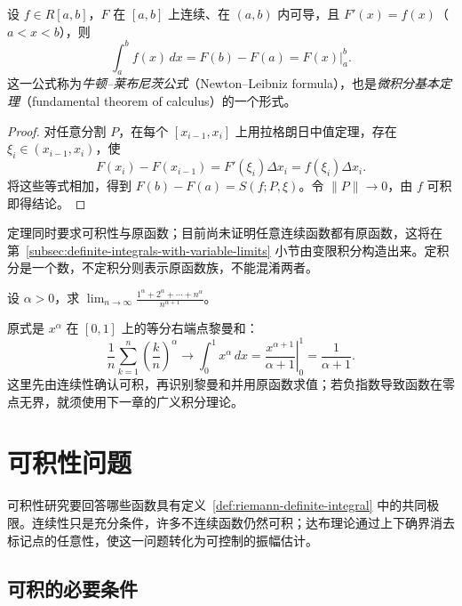 \begin{theorem}[牛顿--莱布尼茨公式]
\label{thm:newton-leibniz-integrable-antiderivative}
设 $f\in R[a,b]$，$F$ 在 $[a,b]$ 上连续、在 $(a,b)$ 内可导，且 $F'(x)=f(x)$（$a<x<b$），则
\begin{equation}
    \int_a^b f(x)\,dx=F(b)-F(a)
    =\left.F(x)\right|_a^b.
    \label{eq:newton-leibniz-formula}
\end{equation}
这一公式称为\emph{牛顿--莱布尼茨公式}（Newton--Leibniz formula），也是\emph{微积分基本定理}（fundamental theorem of calculus）的一个形式。
\end{theorem}
\begin{proof}
对任意分割 $P$，在每个 $[x_{i-1},x_i]$ 上用拉格朗日中值定理，存在 $\xi_i\in(x_{i-1},x_i)$，使
\[
    F(x_i)-F(x_{i-1})=F'(\xi_i)\Delta x_i=f(\xi_i)\Delta x_i.
\]
将这些等式相加，得到 $F(b)-F(a)=S(f;P,\xi)$。令 $\|P\|\to0$，由 $f$ 可积即得结论。
\end{proof}

定理同时要求可积性与原函数；目前尚未证明任意连续函数都有原函数，这将在第~\ref{subsec:definite-integrals-with-variable-limits} 小节由变限积分构造出来。定积分是一个数，不定积分则表示原函数族，不能混淆两者。

\begin{example}
\label{ex:power-sum-limit-by-integral}
设 $\alpha>0$，求 $\displaystyle\lim_{n\to\infty}\frac{1^\alpha+2^\alpha+\cdots+n^\alpha}{n^{\alpha+1}}$。
\end{example}
\begin{solve}
原式是 $x^\alpha$ 在 $[0,1]$ 上的等分右端点黎曼和：
\[
    \frac1n\sum_{k=1}^n\left(\frac kn\right)^\alpha
    \longrightarrow\int_0^1x^\alpha\,dx
    =\left.\frac{x^{\alpha+1}}{\alpha+1}\right|_0^1
    =\frac1{\alpha+1}.
\]
这里先由连续性确认可积，再识别黎曼和并用原函数求值；若负指数导致函数在零点无界，就须使用下一章的广义积分理论。
\end{solve}

\section{可积性问题}
\label{sec:integrability}

可积性研究要回答哪些函数具有定义~\ref{def:riemann-definite-integral} 中的共同极限。连续性只是充分条件，许多不连续函数仍然可积；达布理论通过上下确界消去标记点的任意性，使这一问题转化为可控制的振幅估计。

\subsection{可积的必要条件}
\label{subsec:necessary-conditions-for-integrability}

